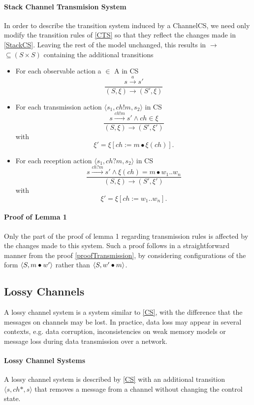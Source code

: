 \paragraph{Stack Channel Transmision System}
In order to describe the transition system induced by a ChannelCS, we need only modify the transition rules of \ref{CTS} so that they reflect the changes made in \ref{StackCS}. Leaving the rest of the model unchanged, this results in $\rightarrow$ $\subseteq (S \times S)$ containing the additional transitions
\begin{itemize}
    \item
      For each observable action a $\in$ A in CS
      \[
      \dfrac{s \xrightarrow{a} s'}{(S, \xi) \rightarrow (S', \xi)}
      \]
    \item
      For each transmission action $\langle s_1, ch!m, s_2 \rangle$ in CS
      \[
      \dfrac{s \xrightarrow{ch!m} s' \wedge ch \in \xi}{(S, \xi) \rightarrow (S', \xi')} \] with \[ \xi' = \xi[ch := m \bullet \xi (ch)].
      \]
    \item
      For each reception action $\langle s_1, ch?m, s_2 \rangle$ in CS
      \[
      \dfrac{s \xrightarrow{ch?m} s' \wedge \xi(ch) = m \bullet w_1..w_n}{(S, \xi) \rightarrow (S', \xi')} \] with \[ \xi' = \xi[ch:= w_1..w_n].
      \]
  \end{itemize}

\paragraph{Proof of Lemma 1}
Only the part of the proof of lemma 1 regarding transmission rules is affected by the changes made to this system. Such a proof follows in a straightforward manner from the proof \ref{proofTransmission}, by considering configurations of the form  $\langle S, m\bullet w'\rangle$ rather than $\langle S, w'\bullet m\rangle$.

\subsection{Lossy Channels}
A lossy channel system is a system similar to \ref{CS}, with the difference that the messages on channels may be lost. In practice, data loss may appear in several contexts, e.g. data corruption, inconsistencies on weak memory models or message loss during data transmission over a network.

\paragraph{Lossy Channel Systems}
A lossy channel system is described by \ref{CS} with an additional transition $\langle s, ch*, s\rangle$ that removes a message from a channel without changing the control state.

